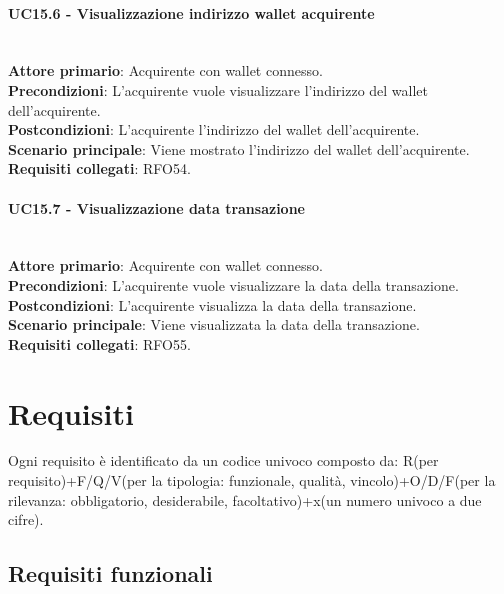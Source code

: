 \documentclass[a4paper, 12pt]{article}
\begin{document}
\paragraph{UC15.6 - Visualizzazione indirizzo wallet acquirente}\\
\textbf{Attore primario}: Acquirente  con wallet connesso.\\
\textbf{Precondizioni}: L'acquirente vuole visualizzare l'indirizzo del wallet dell'acquirente.\\
\textbf{Postcondizioni}: L'acquirente l'indirizzo del wallet dell'acquirente.\\
\textbf{Scenario principale}: Viene mostrato l'indirizzo del wallet dell'acquirente.\\
\textbf{Requisiti collegati}: RFO54.

\paragraph{UC15.7 - Visualizzazione data transazione}\\
\textbf{Attore primario}: Acquirente  con wallet connesso.\\
\textbf{Precondizioni}: L'acquirente vuole visualizzare la data della transazione.\\
\textbf{Postcondizioni}: L'acquirente visualizza la data della transazione.\\
\textbf{Scenario principale}: Viene visualizzata la data della transazione.\\
\textbf{Requisiti collegati}: RFO55.

\section{Requisiti}
Ogni requisito è identificato da un codice univoco composto da: R(per requisito)+F/Q/V(per la tipologia: funzionale, qualità, vincolo)+O/D/F(per la rilevanza: obbligatorio, desiderabile, facoltativo)+x(un numero univoco a due cifre).
\subsection{Requisiti funzionali}
\end{document}
